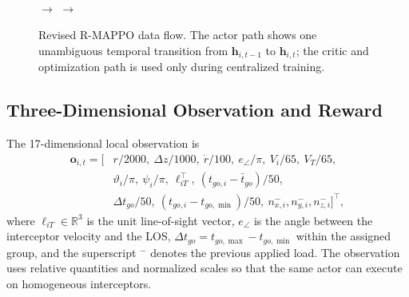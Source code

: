 \documentclass[lettersize,journal]{IEEEtran}
\begin{document}
{\begin{figure}[!t]
\centering
{}\\[5pt]
\(\longrightarrow\)
\(\longrightarrow\)
\caption{Revised R-MAPPO data flow. The actor path shows one unambiguous temporal
transition from \(\mathbf{h}_{i,t-1}\) to \(\mathbf{h}_{i,t}\); the critic and
optimization path is used only during centralized training.}
\label{fig:algorithm_flow}
\end{figure}

\subsection{Three-Dimensional Observation and Reward}
\label{subsec:state_reward}

The 17-dimensional local observation is
\begin{equation}
\label{eq:observation_space}
\begin{split}
\mathbf{o}_{i,t}=[&
r/2000,\ \Delta z/1000,\ \dot r/100,\ e_\angle/\pi,\
V_i/65,\ V_T/65,\\
&\vartheta_i/\pi,\ \psi_i/\pi,\ \boldsymbol{\ell}_{iT}^\top,\
(t_{go,i}-\bar t_{go})/50,\\
&\Delta t_{go}/50,\ (t_{go,i}-t_{go,\min})/50,\
n_{x,i}^{-},n_{y,i}^{-},n_{z,i}^{-}]^\top ,
\end{split}
\end{equation}
where \(\boldsymbol{\ell}_{iT}\in\mathbb{R}^3\) is the unit line-of-sight
vector, \(e_\angle\) is the angle between the interceptor velocity and the LOS,
\(\Delta t_{go}=t_{go,\max}-t_{go,\min}\) within the assigned group, and the
superscript \({}^{-}\) denotes the previous applied load. The observation uses
relative quantities and normalized scales so that the same actor can execute on
homogeneous interceptors.

}
\end{document}
